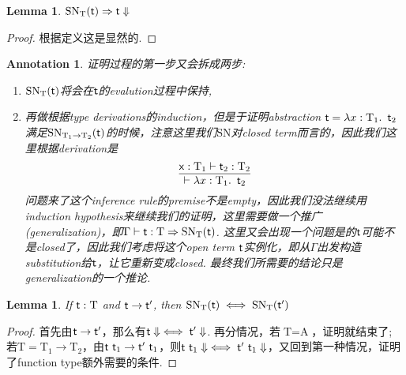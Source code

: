 \documentclass{article}
\theoremstyle{plain}
\newtheorem{lemma}[theorem]{Lemma}
\newtheorem{annotation}[theorem]{Annotation}
\theoremstyle{nonumberplain}
\newtheorem{proof}{Proof}
\newcommand{\lam}[2]{\ensuremath{\lambda #1\ldotp~ #2}} %
\newcommand{\singletype}[1]{\text{#1}}
\newcommand{\termtype}[2]{\ensuremath{#1:#2}}
\newcommand{\term}[1]{\ensuremath\mathsf{#1}}
\begin{document}
\begin{lemma}\label{logical predicate well-defined}
\rm $\text{SN}_\singletype{T}(\term{t}) \Rightarrow \term{t}\Downarrow$
\end{lemma}

\begin{proof}
根据定义这是显然的. 
\end{proof}

\begin{annotation}
\rm 证明过程的第一步又会拆成两步:
\begin{enumerate}
	\item $\text{SN}_\singletype{T}(\term{t})$将会在$\term{t}$的evalution过程中保持,
	\item 再做根据type derivations的induction，但是于证明abstraction $\term{t}=\lam{\termtype{x}{\singletype{T}_1}}{\term{t}_2}$满足$\text{SN}_{\singletype{T}_1 \to \singletype{T}_2}(\term{t})$的时候，注意这里我们$\text{SN}$对closed term而言的，因此我们这里根据derivation是
	$$
	\infer{\vdash \lam{\termtype{x}{\singletype{T}_1}}{\term{t}_2}}{\termtype{\term{x}}{\singletype{T}_1} \vdash \termtype{\term{t}_2}{\singletype{T}_2}}
	$$
	问题来了这个inference rule的premise不是empty，因此我们没法继续用induction hypothesis来继续我们的证明，这里需要做一个推广(generalization)，即$\Gamma	\vdash \termtype{\term{t}}{\singletype{T}} \Rightarrow \text{SN}_\singletype{T}(\term{t})$.  这里又会出现一个问题是的$\term{t}$可能不是closed了，因此我们考虑将这个open term $\term{t}$实例化，即从$\Gamma$出发构造substitution给$\term{t}$，让它重新变成closed. 最终我们所需要的结论只是generalization的一个推论.
\end{enumerate}
\end{annotation}

\begin{lemma}\label{logical predicate preserved under evalutaion}
\rm If $\termtype{\term{t}}{\singletype{T}}$ and $\term{t} \to \term{t}'$, then $\text{SN}_{\singletype{T}}(\term{t}) \iff \text{SN}_{\singletype{T}}(\term{t}')$ 
\end{lemma}

\begin{proof}
首先由$\term{t} \to \term{t}'$，那么有$\term{t}\Downarrow \iff \term{t}'\Downarrow$. 再分情况，若$\singletype{T} = \singletype{A}$，证明就结束了; 若$\singletype{T} = \singletype{T}_1 \to \singletype{T}_2$，由$\term{t}~\term{t}_1 \to \term{t'}~\term{t}_1 $，则$\term{t}~\term{t}_1\Downarrow \iff \term{t}'~\term{t}_1\Downarrow$，又回到第一种情况，证明了function type额外需要的条件. 
\end{proof}
\end{document}
